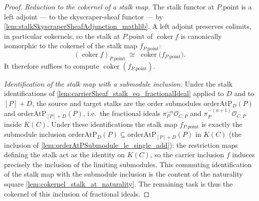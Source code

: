 \begin{proof}
        \leanok
  \emph{Reduction to the cokernel of a stalk map.} The stalk functor at
  \(P.\mathrm{point}\) is a left adjoint --- to the skyscraper-sheaf functor ---
  by \cref{lem:stalkSkyscraperSheafAdjunction_mathlib}. A left adjoint preserves
  colimits, in particular cokernels, so the stalk at \(P.\mathrm{point}\) of
  \(\operatorname{coker} f\) is canonically isomorphic to the cokernel of the
  stalk map \(f_{P.\mathrm{point}}\):
  \[
    (\operatorname{coker} f)_{P.\mathrm{point}} \;\cong\;
    \operatorname{coker}\!\bigl(f_{P.\mathrm{point}}\bigr).
  \]
  It therefore suffices to compute \(\operatorname{coker}(f_{P.\mathrm{point}})\).

  \emph{Identification of the stalk map with a submodule inclusion.} Under the
  stalk identifications of \cref{lem:carrierSheaf_stalk_eq_fractionalIdeal}
  applied to \(D\) and to \([P]+D\), the source and target stalks are the order
  submodules \(\mathrm{orderAtP}_D(P)\) and \(\mathrm{orderAtP}_{[P]+D}(P)\),
  i.e.\ the fractional ideals \(\pi_P^{-n}\mathcal O_{C,P}\) and
  \(\pi_P^{-(n+1)}\mathcal O_{C,P}\) inside \(K(C)\). Under these
  identifications the stalk map \(f_{P.\mathrm{point}}\) is exactly the submodule
  inclusion
  \(\mathrm{orderAtP}_D(P) \subseteq \mathrm{orderAtP}_{[P]+D}(P)\) in \(K(C)\)
  (the inclusion of \cref{lem:orderAtPSubmodule_le_single_add}): the restriction
  maps defining the stalk act as the identity on \(K(C)\), so the carrier
  inclusion \(f\) induces precisely the inclusion of the limiting submodules.
  This commuting identification of the stalk map with the submodule inclusion is
  the content of the naturality square
  \cref{lem:cokernel_stalk_at_naturality}. The remaining task is thus the
  cokernel of this inclusion of fractional ideals.


\end{proof}
